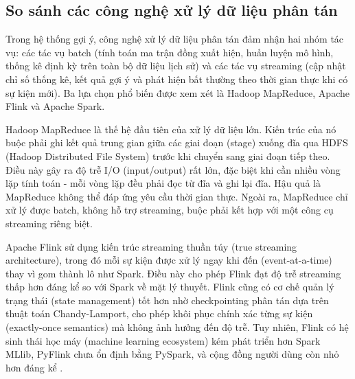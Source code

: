 \documentclass[../BTL.tex]{subfiles}
\begin{document}
\subsection{So sánh các công nghệ xử lý dữ liệu phân tán}

\begin{table}[H]
\centering
{}
\caption{So sánh Apache Spark với Apache Flink và Hadoop MapReduce}
\label{tab:spark_compare}
\end{table}

Trong hệ thống gợi ý, công nghệ xử lý dữ liệu phân tán đảm nhận hai nhóm tác vụ: các tác vụ batch (tính toán ma trận đồng xuất hiện, huấn luyện mô hình, thống kê định kỳ trên toàn bộ dữ liệu lịch sử) và các tác vụ streaming (cập nhật chỉ số thống kê, kết quả gợi ý và phát hiện bất thường theo thời gian thực khi có sự kiện mới). Ba lựa chọn phổ biến được xem xét là Hadoop MapReduce, Apache Flink và Apache Spark.

Hadoop MapReduce là thế hệ đầu tiên của xử lý dữ liệu lớn. Kiến trúc của nó buộc phải ghi kết quả trung gian giữa các giai đoạn (stage) xuống đĩa qua HDFS (Hadoop Distributed File System) trước khi chuyển sang giai đoạn tiếp theo. Điều này gây ra độ trễ I/O (input/output) rất lớn, đặc biệt khi cần nhiều vòng lặp tính toán - mỗi vòng lặp đều phải đọc từ đĩa và ghi lại đĩa. Hậu quả là MapReduce không thể đáp ứng yêu cầu thời gian thực. Ngoài ra, MapReduce chỉ xử lý được batch, không hỗ trợ streaming, buộc phải kết hợp với một công cụ streaming riêng biệt.

Apache Flink sử dụng kiến trúc streaming thuần túy (true streaming architecture), trong đó mỗi sự kiện được xử lý ngay khi đến (event-at-a-time) thay vì gom thành lô như Spark. Điều này cho phép Flink đạt độ trễ streaming thấp hơn đáng kể so với Spark về mặt lý thuyết. Flink cũng có cơ chế quản lý trạng thái (state management) tốt hơn nhờ checkpointing phân tán dựa trên thuật toán Chandy-Lamport, cho phép khôi phục chính xác từng sự kiện (exactly-once semantics) mà không ảnh hưởng đến độ trễ. Tuy nhiên, Flink có hệ sinh thái học máy (machine learning ecosystem) kém phát triển hơn Spark MLlib, PyFlink chưa ổn định bằng PySpark, và cộng đồng người dùng còn nhỏ hơn đáng kể \cite{spark_vs_flink_aws,spark_vs_flink_estuary}.
\end{document}
